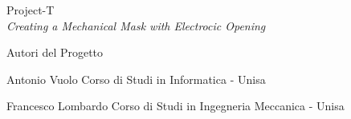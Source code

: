 \documentclass[12pt,letterpaper]{article}
\begin{document}
\begin{center}
  Project-T \\
  \textit{Creating a Mechanical Mask with Electrocic Opening}
\end{center}

\begin{doublespace}
  
\end{doublespace}

\begin{center}
  Autori del Progetto  
\end{center}

  Antonio Vuolo \hfill
  Corso di Studi in Informatica - Unisa
  
  Francesco Lombardo \hfill
  Corso di Studi in Ingegneria Meccanica - Unisa
\end{document}
